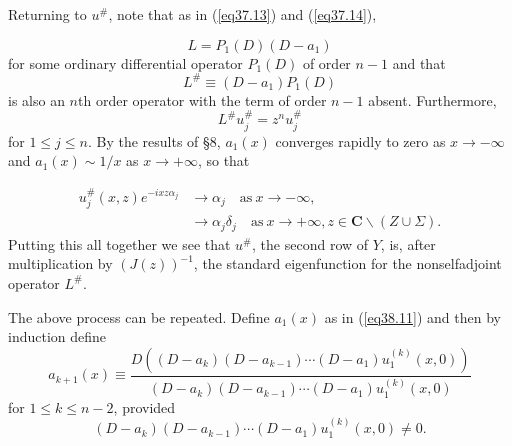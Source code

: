 \documentclass{surv-l}
\theoremstyle{plain}
\theoremstyle{definition}
\numberwithin{equation}{chapter}
\begin{document}
Returning to $u^{\#}$, note that as in (\ref{eq37.13}) and (\ref{eq37.14}),

\begin{equation}\label{eq38.18}
L=P_{1}(D)(D-a_{1})
\end{equation}
for some ordinary differential operator $P_{1}(D)$ of order $n -1$ and that
\begin{equation}\label{eq38.19}
L^{\#}\equiv(D-a_{1})P_{1}(D)
\end{equation}
is also an $n$th order operator with the term of order $n-1$ absent. Furthermore,
\begin{equation*}
L^{\#}u_{j}^{\#}=z^{n}u_{j}^{\#}
\end{equation*}
for $1\leq j\leq n$. By the results of \S 8, $a_{1}(x)$ converges rapidly to zero as $ x\rightarrow-\infty$ and $a_{1}(x)\sim 1/x$ as $ x\rightarrow+\infty$, so that

\begin{align*}
u_{j}^{\#}(x, z)e^{-ixz\alpha_{j}}& \rightarrow\alpha_{j} \quad  \mathrm{as}\  x\rightarrow-\infty, \\
& \rightarrow\alpha_{j}\delta_{j} \quad  \mathrm{as}\  x\rightarrow+\infty, z\in \textbf{C}\backslash (Z\cup\Sigma).
\end{align*}
Putting this all together we see that $u^{\#}$, the second row of $Y$, is, after multiplication by $(J(z))^{-1}$, the standard eigenfunction for the nonselfadjoint operator $L^{\#}$.

The above process can be repeated. Define $a_{1}(x)$ as in (\ref{eq38.11}) and then by induction define
\begin{equation}\label{eq38.20}
a_{k+1}(x)\equiv\frac{D((D-a_{k})(D-a_{k-1})\cdots(D-a_{1})u_{1}^{(k)}(x,0))}{(D-a_{k})(D-a_{k-1})\cdots(D-a_{1})u_{1}^{(k)}(x,0)}
\end{equation}
for $1\leq k\leq n-2$, provided
\begin{equation}\label{eq38.21}
(D-a_{k})(D-a_{k-1})\cdots(D-a_{1})u_{1}^{(k)}(x, 0)\neq 0.
\end{equation}
\end{document}
